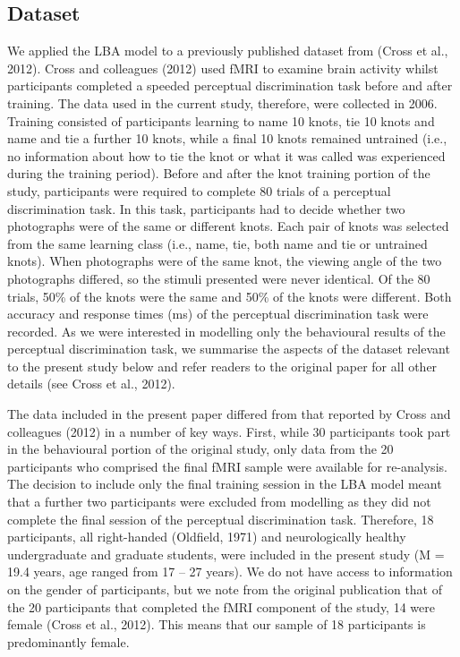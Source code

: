 \documentclass[
  man, donotrepeattitle,floatsintext]{apa6}
\begin{document}
\subsection{Dataset}\label{dataset}

We applied the LBA model to a previously published dataset from (Cross et al., 2012). Cross and colleagues (2012) used fMRI to examine brain activity whilst participants completed a speeded perceptual discrimination task before and after training. The data used in the current study, therefore, were collected in 2006. Training consisted of participants learning to name 10 knots, tie 10 knots and name and tie a further 10 knots, while a final 10 knots remained untrained (i.e., no information about how to tie the knot or what it was called was experienced during the training period). Before and after the knot training portion of the study, participants were required to complete 80 trials of a perceptual discrimination task. In this task, participants had to decide whether two photographs were of the same or different knots. Each pair of knots was selected from the same learning class (i.e., name, tie, both name and tie or untrained knots). When photographs were of the same knot, the viewing angle of the two photographs differed, so the stimuli presented were never identical. Of the 80 trials, 50\% of the knots were the same and 50\% of the knots were different. Both accuracy and response times (ms) of the perceptual discrimination task were recorded. As we were interested in modelling only the behavioural results of the perceptual discrimination task, we summarise the aspects of the dataset relevant to the present study below and refer readers to the original paper for all other details (see Cross et al., 2012).

The data included in the present paper differed from that reported by Cross and colleagues (2012) in a number of key ways. First, while 30 participants took part in the behavioural portion of the original study, only data from the 20 participants who comprised the final fMRI sample were available for re-analysis. The decision to include only the final training session in the LBA model meant that a further two participants were excluded from modelling as they did not complete the final session of the perceptual discrimination task. Therefore, 18 participants, all right-handed (Oldfield, 1971) and neurologically healthy undergraduate and graduate students, were included in the present study (M = 19.4 years, age ranged from 17 -- 27 years). We do not have access to information on the gender of participants, but we note from the original publication that of the 20 participants that completed the fMRI component of the study, 14 were female (Cross et al., 2012). This means that our sample of 18 participants is predominantly female.
\end{document}
